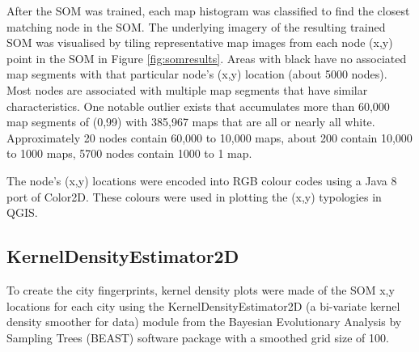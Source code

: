 \documentclass[9pt,twocolumn,twoside,lineno]{pnas-new}
\begin{document}
{After the SOM was trained, each map histogram was classified to find the closest matching node in the SOM. The underlying imagery of the resulting trained SOM was visualised by tiling representative map images from each node (x,y) point in the SOM in Figure \ref{fig:somresults}. Areas with black have no associated map segments with that particular node's (x,y) location (about 5000 nodes). Most nodes are associated with multiple map segments that have similar characteristics. One notable outlier exists that accumulates more than 60,000 map segments of (0,99) with 385,967 maps that are all or nearly all white. Approximately 20 nodes contain 60,000 to 10,000 maps, about 200 contain 10,000 to 1000 maps, 5700 nodes contain 1000 to 1 map.



The node's (x,y) locations were encoded into RGB colour codes using a Java 8 port of Color2D\cite{Jackle2017,Steiger2015}. These colours were used in plotting the (x,y) typologies in QGIS\cite{QGIS2009}.


\subsection*{KernelDensityEstimator2D}\label{kerneldensity}

To create the city fingerprints, kernel density plots were made of the SOM x,y locations for each city using the KernelDensityEstimator2D (a bi-variate kernel density smoother for data) module from the Bayesian Evolutionary Analysis by Sampling Trees (BEAST) software package \cite{Suchard2018} with a smoothed grid size of 100.


}
\end{document}
